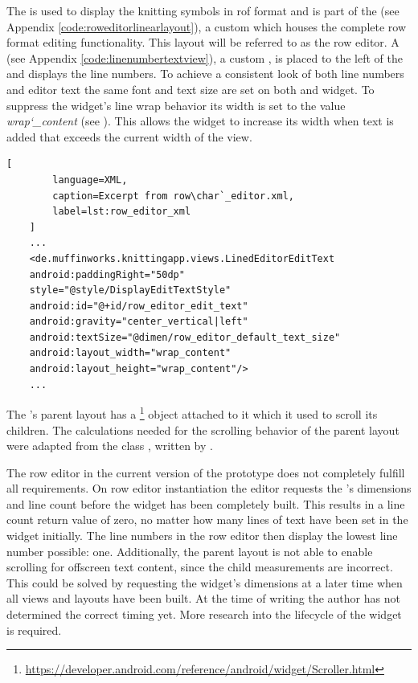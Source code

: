 The  is used to display the knitting symbols in rof format and is part of the  (see Appendix \ref{code:roweditorlinearlayout}), a custom  which houses the complete row format editing functionality. This layout will be referred to as the row editor. A  (see Appendix \ref{code:linenumbertextview}), a custom , is placed to the left of the  and displays the line numbers. To achieve a consistent look of both line numbers and editor text the same font and text size are set on both  and  widget.
To suppress the  widget's line wrap behavior its width is set to the value \textit{wrap\char`_content} (see ). This allows the widget to increase its width when text is added that exceeds the current width of the view.

\begin{lstlisting}[
		language=XML, 
		caption=Excerpt from row\char`_editor.xml, 
		label=lst:row_editor_xml
	]
	...
    <de.muffinworks.knittingapp.views.LinedEditorEditText
    android:paddingRight="50dp"
    style="@style/DisplayEditTextStyle"
    android:id="@+id/row_editor_edit_text"
    android:gravity="center_vertical|left"
    android:textSize="@dimen/row_editor_default_text_size"
    android:layout_width="wrap_content"
    android:layout_height="wrap_content"/>
	...
\end{lstlisting}

The 's parent layout has a \footnote{\url{https://developer.android.com/reference/android/widget/Scroller.html}} object attached to it which it used to scroll its children. The calculations needed for the scrolling behavior of the parent layout were adapted from the class , written by \cite{clark2010}. 

The row editor in the current version of the prototype does not completely fulfill all requirements. On row editor instantiation the editor requests the 's dimensions and line count before the widget has been completely built. This results in a line count return value of zero, no matter how many lines of text have been set in the widget initially. The line numbers in the row editor then display the lowest line number possible: one. Additionally, the parent layout is not able to enable scrolling for offscreen text content, since the child measurements are incorrect. This could be solved by requesting the  widget's dimensions at a later time when all views and layouts have been built. At the time of writing the author has not determined the correct timing yet. More research into the lifecycle of the widget is required.

